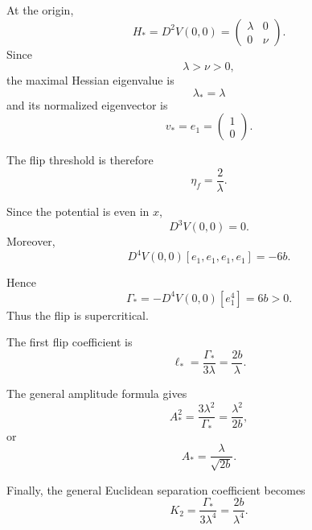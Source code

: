 At the origin,
\begin{equation}
H_*
=
D^2V(0,0)
=
\begin{pmatrix}
\lambda&0
\\
0&\nu
\end{pmatrix}.
\label{eq:planar-Hessian}
\end{equation}
Since
\[
\lambda>\nu>0,
\]
the maximal Hessian eigenvalue is
\begin{equation}
\lambda_*=\lambda
\label{eq:planar-lambda-star}
\end{equation}
and its normalized eigenvector is
\begin{equation}
v_*
=
e_1
=
\begin{pmatrix}
1\\0
\end{pmatrix}.
\label{eq:planar-v-star}
\end{equation}

The flip threshold is therefore
\begin{equation}
\boxed{
\eta_f
=
\frac{2}{\lambda}.
}
\label{eq:planar-flip-threshold}
\end{equation}

Since the potential is even in $x$,
\begin{equation}
D^3V(0,0)=0.
\label{eq:planar-third-zero}
\end{equation}
Moreover,
\begin{equation}
D^4V(0,0)[e_1,e_1,e_1,e_1]
=
-6b.
\label{eq:planar-fourth}
\end{equation}

Hence
\begin{equation}
\Gamma_*
=
-
D^4V(0,0)[e_1^4]
=
6b>0.
\label{eq:planar-Gamma}
\end{equation}
Thus the flip is supercritical.

The first flip coefficient is
\begin{equation}
\boxed{
\ell_*
=
\frac{\Gamma_*}{3\lambda}
=
\frac{2b}{\lambda}.
}
\label{eq:planar-ell}
\end{equation}

The general amplitude formula gives
\begin{equation}
\boxed{
A_*^2
=
\frac{3\lambda^2}{\Gamma_*}
=
\frac{\lambda^2}{2b},
}
\label{eq:planar-A-square}
\end{equation}
or
\begin{equation}
A_*
=
\frac{\lambda}{\sqrt{2b}}.
\label{eq:planar-A}
\end{equation}

Finally, the general Euclidean separation coefficient becomes
\begin{equation}
\boxed{
K_2
=
\frac{\Gamma_*}{3\lambda^4}
=
\frac{2b}{\lambda^4}.
}
\label{eq:planar-K-general-prediction}
\end{equation}

